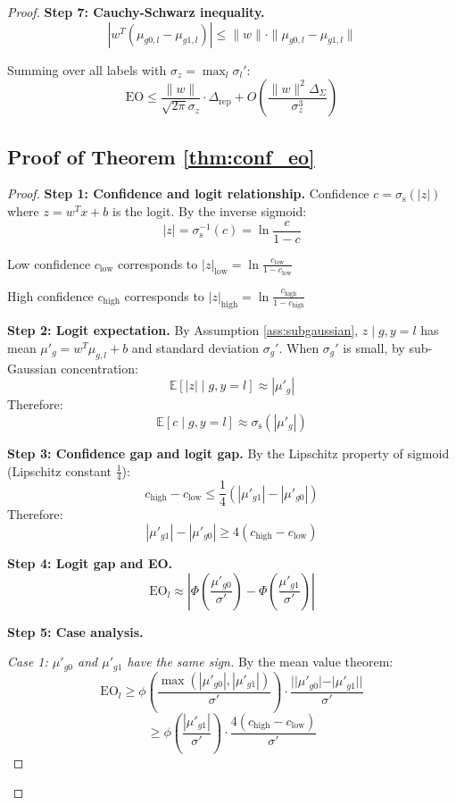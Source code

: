 \documentclass[11pt]{article}
\begin{document}
\begin{proof}
\textbf{Step 7: Cauchy-Schwarz inequality.}
$$|w^T(\mu_{g0,l} - \mu_{g1,l})| \leq \|w\| \cdot \|\mu_{g0,l} - \mu_{g1,l}\|$$

Summing over all labels with $\sigma_z = \max_l \sigma_l'$:
$$\mathrm{EO} \leq \frac{\|w\|}{\sqrt{2\pi}\sigma_z} \cdot \Delta_{\mathrm{rep}} + O\left(\frac{\|w\|^2 \Delta_{\Sigma}}{\sigma_z^3}\right)$$

\subsection{Proof of Theorem \ref{thm:conf_eo}}

\begin{proof}
\textbf{Step 1: Confidence and logit relationship.} Confidence $c = \sigma_{\text{s}}(|z|)$ where $z = w^T x + b$ is the logit. By the inverse sigmoid:
$$|z| = \sigma_{\text{s}}^{-1}(c) = \ln\frac{c}{1-c}$$

Low confidence $c_{\mathrm{low}}$ corresponds to $|z|_{\mathrm{low}} = \ln\frac{c_{\mathrm{low}}}{1-c_{\mathrm{low}}}$

High confidence $c_{\mathrm{high}}$ corresponds to $|z|_{\mathrm{high}} = \ln\frac{c_{\mathrm{high}}}{1-c_{\mathrm{high}}}$

\textbf{Step 2: Logit expectation.} By Assumption \ref{ass:subgaussian}, $z \mid g, y=l$ has mean $\mu'_g = w^T \mu_{g,l} + b$ and standard deviation $\sigma_g'$. When $\sigma_g'$ is small, by sub-Gaussian concentration:
$$\mathbb{E}[|z| \mid g, y=l] \approx |\mu'_g|$$
Therefore:
$$\mathbb{E}[c \mid g, y=l] \approx \sigma_{\text{s}}(|\mu'_g|)$$

\textbf{Step 3: Confidence gap and logit gap.} By the Lipschitz property of sigmoid (Lipschitz constant $\frac{1}{4}$):
$$c_{\mathrm{high}} - c_{\mathrm{low}} \leq \frac{1}{4}(|\mu'_{g1}| - |\mu'_{g0}|)$$
Therefore:
$$|\mu'_{g1}| - |\mu'_{g0}| \geq 4(c_{\mathrm{high}} - c_{\mathrm{low}})$$

\textbf{Step 4: Logit gap and EO.}
$$\mathrm{EO}_l \approx \left|\Phi\left(\frac{\mu'_{g0}}{\sigma'}\right) - \Phi\left(\frac{\mu'_{g1}}{\sigma'}\right)\right|$$

\textbf{Step 5: Case analysis.}

\textit{Case 1: $\mu'_{g0}$ and $\mu'_{g1}$ have the same sign.} By the mean value theorem:
$$\mathrm{EO}_l \geq \phi\left(\frac{\max(|\mu'_{g0}|, |\mu'_{g1}|)}{\sigma'}\right) \cdot \frac{||\mu'_{g0}| - |\mu'_{g1}||}{\sigma'}$$
$$\geq \phi\left(\frac{|\mu'_{g1}|}{\sigma'}\right) \cdot \frac{4(c_{\mathrm{high}} - c_{\mathrm{low}})}{\sigma'}$$


\end{proof}
\end{proof}
\end{document}
